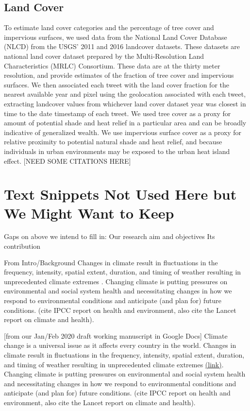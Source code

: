 

\subsection{Land Cover}
To estimate land cover categories and the percentage of tree cover and impervious surfaces, we used data from the National Land Cover Database (NLCD) from the USGS' 2011  \cite{homer_completion_2015} and 2016 \cite{yang_new_2018} landcover datasets. These datasets are national land cover dataset prepared by the Multi-Resolution Land Characteristics (MRLC) Consortium.  These data are at the thirty meter resolution, and provide estimates of the fraction of tree cover and impervious surfaces.  We then associated each tweet with the land cover fraction for the nearest available year and pixel using the geolocation associated with each tweet, extracting landcover values from whichever land cover dataset year was closest in time to the date timestamp of each tweet. We used tree cover as a proxy for amount of potential shade and heat relief in a particular area and can be broadly indicative of generalized wealth. We use impervious surface cover as a proxy for relative proximity to potential natural shade and heat relief, and because individuals in urban environments may be exposed to the urban heat island effect. [NEED SOME CITATIONS HERE] 

\section*{Text Snippets Not Used Here but We Might Want to Keep}
Gaps on above we intend to fill in:
Our research aim and objectives
Its contribution

From Intro/Background
Changes in climate result in fluctuations in the frequency, intensity, spatial extent, duration, and timing of weather resulting in unprecedented climate extremes . Changing climate is putting pressures on environmental and social system health and necessitating changes in how we respond to environmental conditions and anticipate (and plan for) future conditions. (cite IPCC report on health and environment, also cite the Lancet report on climate and health). 

[from our Jan/Feb 2020 draft working manuscript in Google Docs]
Climate change is a universal issue as it affects every country in the world. Changes in climate result in fluctuations in the frequency, intensity, spatial extent, duration, and timing of weather resulting in unprecedented climate extremes \href{https://www.ipcc.ch/site/assets/uploads/2018/03/SREX-Chap3_FINAL-1.pdf}{(link)}. Changing climate is putting pressures on environmental and social system health and necessitating changes in how we respond to environmental conditions and anticipate (and plan for) future conditions. (cite IPCC report on health and environment, also cite the Lancet report on climate and health).

